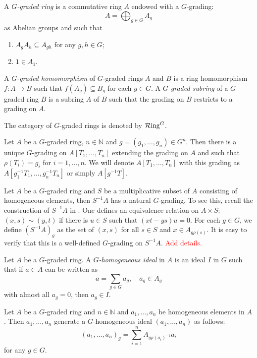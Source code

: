 \begin{definition}
    A \emph{$G$-graded ring} is a commutative ring $A$ endowed with a $G$-grading:
    \[
        A=\bigoplus_{g\in G} A_g  
    \]
    as Abelian groups and such that 
    \begin{enumerate}
        \item $A_{g}A_{h}\subseteq A_{gh}$ for any $g,h\in G$;
        \item $1\in A_1$.
    \end{enumerate}

    

    A \emph{$G$-graded homomorphism} of $G$-graded rings $A$ and $B$ is a ring homomorphism $f:A\rightarrow B$ such that $f(A_g)\subseteq B_g$ for each $g\in G$. A \emph{$G$-graded subring}  of a $G$-graded ring $B$ is a subring $A$ of $B$ such that the grading on $B$ restricts to a grading on $A$.

    The category of $G$-graded rings is denoted by $\mathcal{R}\mathrm{ing}^G$.
\end{definition}

\begin{example}
    Let $A$ be a $G$-graded ring, $n\in \mathbb{N}$ and $g=(g_1,\ldots,g_n)\in G^n$. Then there is a unique $G$-grading on $A[T_1,\ldots,T_n]$ extending the grading on $A$ and such that $\rho(T_i)=g_i$ for $i=1,\ldots,n$. We will denote $A[T_1,\ldots,T_n]$ with this grading as $A[g_{1}^{-1}T_1,\ldots,g_{n}^{-1}T_n]$ or simply $A[g^{-1}T]$.
\end{example}

\begin{example}\label{ex-localizationgradedring}
    Let $A$ be a $G$-graded ring and $S$ be a multiplicative subset of $A$ consisting of homogeneous elements, then $S^{-1}A$ has a natural $G$-grading. To see this, recall the construction of $S^{-1}A$ in \cite[\href{https://stacks.math.columbia.edu/tag/00CM}{Tag 00CM}]{stacks-project}. One defines an equivalence relation on $A\times S$: $(x,s)\sim (y,t)$ if there is $u\in S$ such that $(xt-ys)u=0$. For each $g\in G$, we define $(S^{-1}A)_g$ as the set of $(x,s)$ for all $s\in S$ and $x\in A_{g\rho(s)}$. It is easy to verify that this is a well-defined $G$-grading on $S^{-1}A$.  \textcolor{red}{Add details.}
\end{example}

\begin{definition}
    Let $A$ be a $G$-graded ring. A \emph{$G$-homogeneous ideal} in $A$ is an ideal $I$ in $G$ such that if $a\in A$ can be written as 
    \[
        a=\sum_{g\in G} a_g,\quad a_g\in A_g  
    \]
    with almost all $a_g=0$, then $a_g\in I$.
\end{definition}
\begin{example}\label{ex-homogeneousidealgeneratedbyelements}
    Let $A$ be a $G$-graded ring and $n\in \mathbb{N}$ and $a_1,\ldots,a_n$ be homogeneous elements in $A$. Then $a_1,\ldots,a_n$ generate a $G$-homogeneous ideal $(a_1,\ldots,a_n)$ as follows:
    \[
        (a_1,\ldots,a_n)_g=\sum_{i=1}^n A_{g \rho(a_i)^{-1}}a_i
    \]
    for any $g\in G$.
\end{example}



